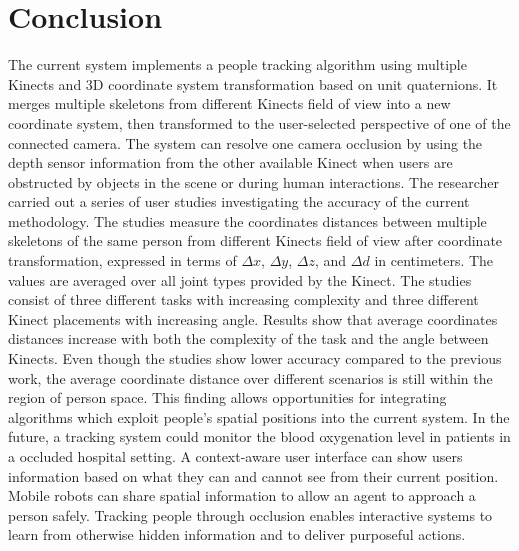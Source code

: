 


\chapter{Conclusion}

\label{chapter:conclusion}

The current system implements a people tracking algorithm using multiple Kinects and 3D coordinate system transformation based on unit quaternions. It merges multiple skeletons from different Kinects field of view into a new coordinate system, then transformed to the user-selected perspective of one of the connected camera. The system can resolve one camera occlusion by using the depth sensor information from the other available Kinect when users are obstructed by objects in the scene or during human interactions. The researcher carried out a series of user studies investigating the accuracy of the current methodology. The studies measure the coordinates distances between multiple skeletons of the same person from different Kinects field of view after coordinate transformation, expressed in terms of $\Delta x$, $\Delta y$, $\Delta z$, and $\Delta d$ in centimeters. The values are averaged over all joint types provided by the Kinect. The studies consist of three different tasks with increasing complexity and three different Kinect placements with increasing angle. Results show that average coordinates distances increase with both the complexity of the task and the angle between Kinects. Even though the studies show lower accuracy compared to the previous work, the average coordinate distance over different scenarios is still within the region of person space. This finding allows opportunities for integrating algorithms which exploit people's spatial positions into the current system. In the future, a tracking system could monitor the blood oxygenation level in patients in a occluded hospital setting. A context-aware user interface can show users information based on what they can and cannot see from their current position. Mobile robots can share spatial information to allow an agent to approach a person safely. Tracking people through occlusion enables interactive systems to learn from otherwise hidden information and to deliver purposeful actions.


